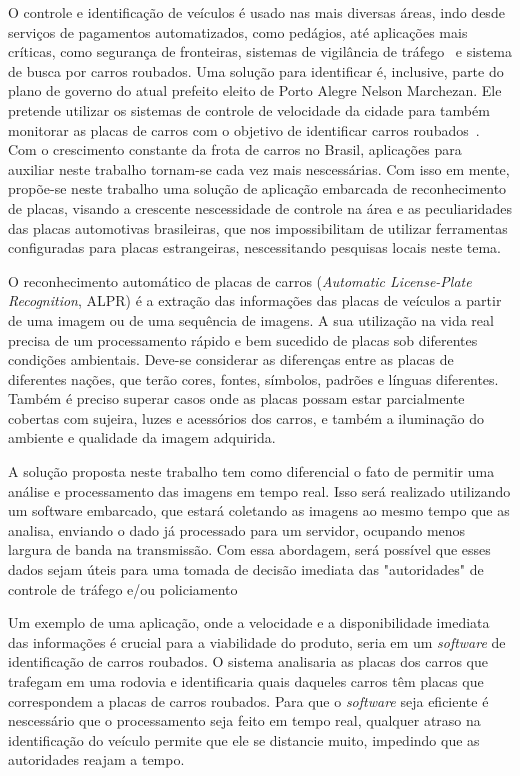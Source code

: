 O controle e identificação de veículos é usado nas mais diversas áreas, indo
desde serviços de pagamentos automatizados, como pedágios, até aplicações mais
críticas, como segurança de fronteiras, sistemas de vigilância de
tráfego~\cite{ahmad2015automatic} e sistema de busca por carros roubados.
Uma solução para identificar é, inclusive,  parte do plano de governo do atual prefeito eleito de Porto Alegre
Nelson Marchezan. Ele pretende utilizar os sistemas de controle de velocidade da cidade para também
monitorar as placas de carros com o objetivo de identificar carros roubados~\cite{psdb2016marchezan}.
Com o crescimento constante da frota de carros no Brasil, aplicações para
auxiliar neste trabalho tornam-se cada vez
mais nescessárias. Com isso em mente, propõe-se neste trabalho uma solução de
aplicação embarcada de reconhecimento de placas, visando a
crescente nescessidade de controle na área e as peculiaridades das placas
automotivas brasileiras, que nos impossibilitam de utilizar ferramentas
configuradas para placas estrangeiras, nescessitando pesquisas locais neste
tema.

O reconhecimento automático de placas de carros (\emph{Automatic License-Plate
Recognition}, ALPR) é a extração das informações das placas de veículos a partir
de uma imagem ou de uma sequência de imagens. A sua utilização na vida real
precisa de um processamento rápido e bem sucedido de placas sob diferentes
condições ambientais. Deve-se considerar as diferenças entre as placas de
diferentes nações, que terão cores, fontes, símbolos, padrões e línguas
diferentes. Também é preciso superar casos onde as placas possam estar
parcialmente cobertas com sujeira, luzes e acessórios dos
carros, e também a iluminação do ambiente e qualidade
da imagem adquirida.~\cite{s2013automatic}

A solução proposta neste trabalho tem como diferencial o fato de permitir uma
análise e processamento das imagens em tempo real. Isso será realizado
utilizando um software embarcado, que estará coletando as imagens ao mesmo tempo
que as analisa, enviando o dado já processado para um servidor, ocupando menos
largura de banda na transmissão. Com essa abordagem, será possível que esses
dados sejam úteis para uma tomada de decisão imediata das "autoridades" de
controle de tráfego e/ou policiamento

Um exemplo de uma aplicação, onde a velocidade e a disponibilidade imediata das
informações é crucial para a viabilidade do produto, seria em um \emph{software}
de identificação de carros roubados. O sistema analisaria as placas dos carros
que trafegam em uma rodovia e identificaria quais daqueles carros têm placas que
correspondem a placas de carros roubados. Para que o \emph{software} seja
eficiente é nescessário que o processamento seja feito em tempo real, qualquer
atraso na identificação do veículo permite que ele se distancie muito, impedindo
que as autoridades reajam a tempo.

